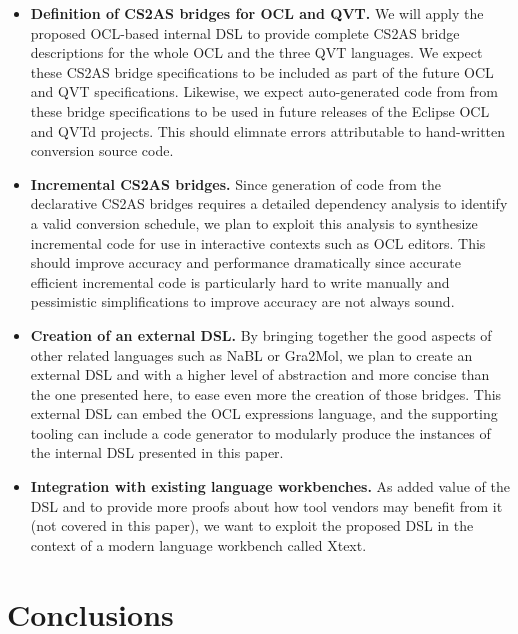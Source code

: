 \documentclass{llncs}
\begin{document}
\begin{itemize}
\item \textbf{Definition of CS2AS bridges for OCL and QVT.} We will apply the proposed OCL-based internal DSL to provide complete CS2AS bridge descriptions for the whole OCL and the three QVT languages. We expect these CS2AS bridge specifications to be included as part of the future OCL and QVT specifications. Likewise, we expect auto-generated code from from these bridge specifications to be used in future releases of the Eclipse OCL and QVTd projects. This should elimnate errors attributable to hand-written conversion source code.

\item \textbf{Incremental CS2AS bridges.} Since generation of code from the declarative CS2AS bridges requires a detailed dependency analysis to identify a valid conversion schedule, we plan to exploit this analysis to synthesize incremental code for use in interactive contexts such as OCL editors. This should improve accuracy and performance dramatically since accurate efficient incremental code is particularly hard to write manually and pessimistic simplifications to improve accuracy are not always sound.

\item \textbf{Creation of an external DSL.} By bringing together the good aspects of other related languages such as NaBL or Gra2Mol, we plan to create an external DSL and with a higher level of abstraction and more concise than the one presented here, to ease even more the creation of those bridges. This external DSL can embed the OCL expressions language, and the supporting tooling can include a code generator to modularly produce the instances of the internal DSL presented in this paper.

\item \textbf{Integration with existing language workbenches.} As added value of the DSL and to provide more proofs about how tool vendors may benefit from it (not covered in this paper), we want to exploit the proposed DSL in the context of a modern language workbench called Xtext.


\end{itemize}

\section{Conclusions}
\label{sec:conclusions}
\end{document}
